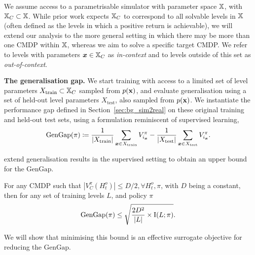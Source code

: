 We assume access to a parametrisable simulator with parameter space ${\mathbb{X}}$, with ${\mathbb{X}}_C \subset {\mathbb{X}}$. While prior work expects ${\mathbb{X}}_C$ to correspond to all solvable levels in ${\mathbb{X}}$ (often defined as the levels in which a positive return is achievable), we will extend our analysis to the more general setting in which there may be more than one CMDP within ${\mathbb{X}}$, whereas we aim to solve a specific target CMDP. We refer to levels with parameters ${\bm{x}} \in {\mathbb{X}}_C$ as \textit{in-context} and to levels outside of this set as \textit{out-of-context}.

\textbf{The generalisation gap.} We start training with access to a limited set of level parameters $X_{\text{train}}\subset {\mathbb{X}}_C$ sampled from $p({\mathbf{x}})$, and evaluate generalisation using a set of held-out level parameters $X_{\text{test}}$, also sampled from $p({\mathbf{x}})$. We instantiate the performance gap defined in Section~\ref{sec:bg_sim2real} on these original training and held-out test sets, using a formulation reminiscent of supervised learning,
\begin{equation} \label{c3:eq:GenGap}
    \text{GenGap}(\pi) \coloneqq \frac{1}{|X_{\text{train}}|} \sum_{{\bm{x}} \in X_{\text{train}}} V^\pi_{i_{\bm{x}}} - \frac{1}{|X_{\text{test}}|}\sum_{{\bm{x}} \in X_{\text{test}}} V^\pi_{i_{\bm{x}}}.
\end{equation}

\citet{instance_invariant} extend generalisation results in the supervised setting \citep{MI_gengap_SL} to obtain an upper bound for the $\text{GenGap}$. 
\begin{theorem}\label{c3:th:gen_gap}
  For any CMDP such that $|V^\pi_C (H_t^o)| \leq D/2,\forall H_t^o, \pi$, with $D$ being a constant, then for any set of training levels $L$, and policy $\pi$
\begin{equation}\label{c3:eq:GenGap_bound}
   \text{GenGap}(\pi) \leq \sqrt{\frac{2D^2}{|L|} \times \text{I}(L;\pi)}.
\end{equation}   
\end{theorem}
We will show that minimising this bound is an effective surrogate objective for reducing the $\text{GenGap}$. 

